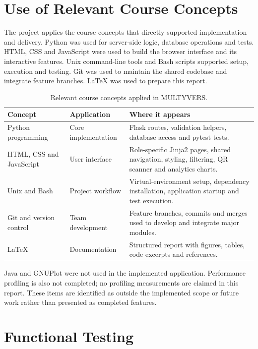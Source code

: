 \documentclass[11pt,a4paper]{article}
\begin{document}
\section{Use of Relevant Course Concepts}
\label{sec:course}
The project applies the course concepts that directly supported implementation and delivery.
Python was used for server-side logic, database operations and tests. HTML, CSS and JavaScript
were used to build the browser interface and its interactive features. Unix command-line tools
and Bash scripts supported setup, execution and testing. Git was used to maintain the shared
codebase and integrate feature branches. \LaTeX{} was used to prepare this report.

\begin{table}[H]
\centering
\caption{Relevant course concepts applied in MULTYVERS.}
\label{tab:course}
\small
\begin{tabularx}{\textwidth}{@{}p{3.0cm}p{2.0cm}X@{}}
\toprule
\textbf{Concept} & \textbf{Application} & \textbf{Where it appears}\\
\midrule
Python programming & Core implementation & Flask routes, validation helpers, database access and pytest tests.\\
HTML, CSS and JavaScript & User interface & Role-specific Jinja2 pages, shared navigation, styling, filtering, QR scanner and analytics charts.\\
Unix and Bash & Project workflow & Virtual-environment setup, dependency installation, application startup and test execution.\\
Git and version control & Team development & Feature branches, commits and merges used to develop and integrate major modules.\\
\LaTeX{} & Documentation & Structured report with figures, tables, code excerpts and references.\\
\bottomrule
\end{tabularx}
\end{table}

Java and GNUPlot were not used in the implemented application. Performance profiling is also
not completed; no profiling measurements are claimed in this report. These items are identified
as outside the implemented scope or future work rather than presented as completed features.

\section{Functional Testing}
\label{sec:testing}
\end{document}
